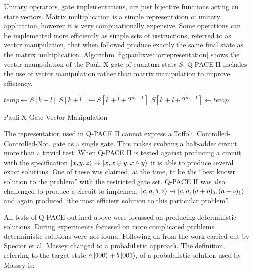 Unitary operators, gate implementations, are just bijective functions acting on state vectors.
Matrix multiplication is a simple representation of unitary application, however it is very computationally expensive.
Some operations can be implemented more efficiently as simple sets of instructions, referred to as vector manipulation, that when followed produce exactly the same final state as the matrix multiplication.
Algorithm \ref{fig:paulixvectorrepresentation} shows the vector manipulation of the Pauli-X gate of quantum state $S$.
Q-PACE II includes the use of vector manipulation rather than matrix manipulation to improve efficiency.
\begin{algorithm}
\begin{algorithmic}
\STATE $temp \gets S[k+l]$
\STATE $S[k+l] \gets S[k+l+2^{m-1}]$
\STATE $S[k+l+2^{m-1}] \gets temp$
\ENDFOR
\ENDFOR
\end{algorithmic}
\caption{Pauli-X Gate Vector Manipulation}
\label{fig:paulixvectorrepresentation}
\end{algorithm}

The representation used in Q-PACE II cannot express a Toffoli, Controlled-Controlled-Not, gate as a single gate.
This makes evolving a half-adder circuit more than a trivial test.
When Q-PACE II is tested against producing a circuit with the specification $\left\vert{x, y, z}\right\rangle\rightarrow\left\vert{x,x \oplus y, x \wedge y}\right\rangle$ it is able to produce several exact solutions.
One of these was claimed, at the time, to be the ``best known solution to the problem''\cite{masseythesis} with the restricted gate set.
Q-PACE II was also challenged to produce a circuit to implement $\left\vert{c, a, b, z}\right\rangle\rightarrow\left\vert{c, a, (a+b)_0, (a+b)_1}\right\rangle$ and again produced ``the most efficient solution to this particular problem''\cite{masseythesis}.


All tests of Q-PACE outlined above were focussed on producing deterministic solutions.
During experiments focussed on more complicated problems deterministic solutions were not found.
Following on from the work carried out by Spector et al\cite{LSpectorGPforQC,LSpectorANDOR,Spector:1999:QCA:316573.317112}, Massey changed to a probabilistic approach.
The definition, referring to the target state $a\left\vert{000}\right\rangle+b\left\vert{001}\right\rangle$, of a probabilistic solution used by Massey is:

